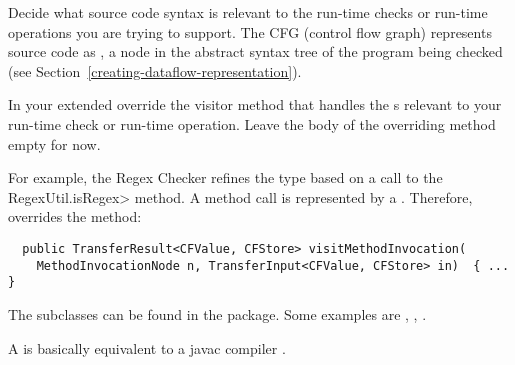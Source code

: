 
Decide what source code syntax is relevant to the run-time checks or
run-time operations you are trying to support.  The CFG (control flow
graph) represents source code as , a
node in the abstract syntax tree of the program being checked (see
Section~\ref{creating-dataflow-representation}).

In your extended 
override the visitor method that handles the s
relevant to your run-time check or run-time operation.
Leave the body of the overriding method empty for now.

For example, the Regex Checker refines the type based on a call to the
\<RegexUtil.isRegex> method.  A method call is represented by a
.  Therefore,
 overrides the
 method:

\begin{smaller}
\begin{Verbatim}
  public TransferResult<CFValue, CFStore> visitMethodInvocation(
    MethodInvocationNode n, TransferInput<CFValue, CFStore> in)  { ... }
\end{Verbatim}
\end{smaller}




The  subclasses can be found in the
 package.  Some examples are
,
,
.

A 
is basically equivalent to a javac compiler .

